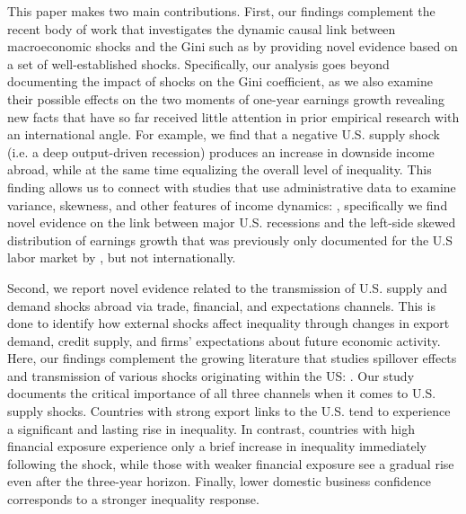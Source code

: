 \documentclass[12pt, a4paper]{article}
\begin{document}
This paper makes two main contributions. First, our findings complement the recent body of work that investigates the dynamic causal link between macroeconomic shocks and the Gini such as \textcite{coibion2017innocent, Davtyan2017, furceri2018effects} by providing novel evidence based on a set of well-established shocks. Specifically, our analysis goes beyond documenting the impact of shocks on the Gini coefficient, as we also examine their possible effects on the two moments of one-year earnings growth revealing new facts that have so far received little attention in prior empirical research with an international angle. For example, we find that a negative U.S. supply shock (i.e. a deep output-driven recession) produces an increase in downside income abroad, while at the same time equalizing the overall level of inequality. This finding allows us to connect with studies that use administrative data to examine variance, skewness, and other features of income dynamics: \textcite{guvenen2014nature, hoffmann2019employment, busch2018asymmetric}, specifically we find novel evidence on the link between major U.S. recessions and the left-side skewed distribution of earnings growth that was previously only documented for the U.S labor market by \textcite{guvenen2014nature}, but not internationally.

Second, we report novel evidence related to the transmission of U.S. supply and demand shocks abroad via trade, financial, and expectations channels. This is done to identify how external shocks affect inequality through changes in export demand, credit supply, and firms' expectations about future economic activity. Here, our findings complement the growing literature that studies spillover effects and transmission of various shocks originating within the US: \textcite{canova2005transmission, mackowiak2007external, akinci2013global, bowman2015us, dedola2017if, carrillo2020inquiry, levchenko2020tfp, di2022international, azad2022spillovers, lastauskas2023global, lastaukas2024}. Our study documents the critical importance of all three channels when it comes to U.S. supply shocks. Countries with strong export links to the U.S. tend to experience a significant and lasting rise in inequality. In contrast, countries with high financial exposure experience only a brief increase in inequality immediately following the shock, while those with weaker financial exposure see a gradual rise even after the three-year horizon. Finally, lower domestic business confidence corresponds to a stronger inequality response.
\end{document}
